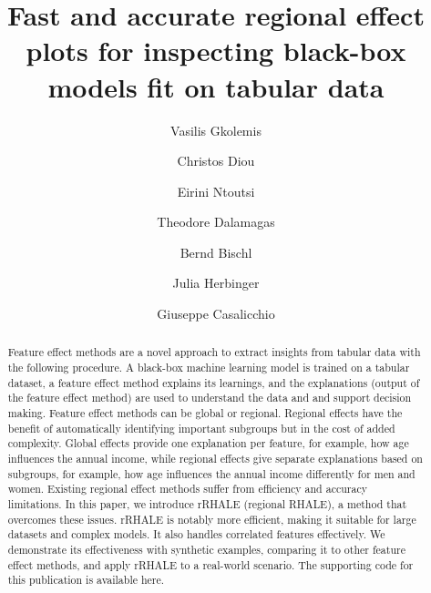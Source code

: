 \documentclass[
twocolumn,
]{ceurart}
\begin{document}


\title{Fast and accurate regional effect plots for inspecting black-box models fit on tabular data}

\author[1,2]{Vasilis Gkolemis}
\address[1]{Harokopio University of Athens}
\address[2]{ATHENA Research Center}
\author[1]{Christos Diou}
\author[3]{Eirini Ntoutsi}
\address[3]{University of the Bundeswehr Munich}
\author[2]{Theodore Dalamagas}
\author[4]{Bernd Bischl}
\address[4]{Munich Center for Machine Learning (MCML), Department of Statistics, LMU Munich}
\author[4]{Julia Herbinger}
\author[4]{Giuseppe Casalicchio}


\begin{abstract}
  Feature effect methods are a novel approach to extract insights from tabular data with the following procedure.  A black-box machine learning model is trained on a tabular dataset, a feature effect method explains its learnings, and the explanations (output of the feature effect method) are used to understand the data and and support decision making.  Feature effect methods can be global or regional. Regional effects have the benefit of automatically identifying important subgroups but in the cost of added complexity. Global effects provide one explanation per feature, for example, how age influences the annual income, while regional effects give separate explanations based on subgroups, for example, how age influences the annual income differently for men and women.  Existing regional effect methods suffer from efficiency and accuracy limitations. In this paper, we introduce rRHALE (regional RHALE), a method that overcomes these issues. rRHALE is notably more efficient, making it suitable for large datasets and complex models. It also handles correlated features effectively. We demonstrate its effectiveness with synthetic examples, comparing it to other feature effect methods, and apply rRHALE to a real-world scenario. The supporting code for this publication is available here.
\end{abstract}
\end{document}
